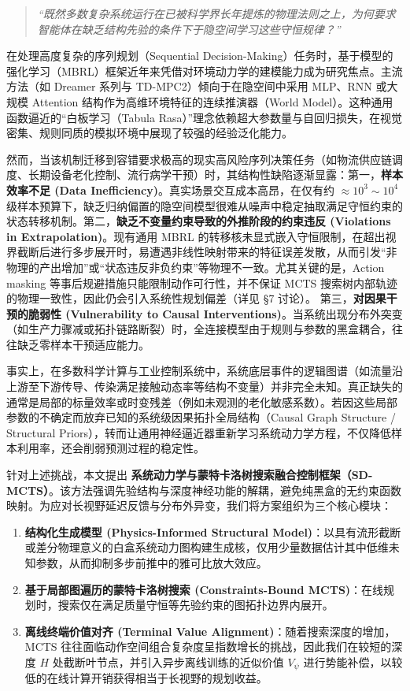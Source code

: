 \documentclass[UTF8]{ctexart}
\begin{document}
\begin{quote}
\emph{``既然多数复杂系统运行在已被科学界长年提炼的物理法则之上，为何要求智能体在缺乏结构先验的条件下于隐空间学习这些守恒规律？''}
\end{quote}

在处理高度复杂的序列规划（Sequential Decision-Making）任务时，基于模型的强化学习（MBRL）框架近年来凭借对环境动力学的建模能力成为研究焦点。主流方法（如 Dreamer 系列与 TD-MPC2）倾向于在隐空间中采用 MLP、RNN 或大规模 Attention 结构作为高维环境特征的连续推演器（World Model）。这种通用函数逼近的``白板学习（Tabula Rasa）''理念依赖超大参数量与自回归损失，在视觉密集、规则同质的模拟环境中展现了较强的经验泛化能力。

然而，当该机制迁移到容错要求极高的现实高风险序列决策任务（如物流供应链调度、长期设备老化控制、流行病学干预）时，其结构性缺陷逐渐显露：第一，\textbf{样本效率不足 (Data Inefficiency)}。真实场景交互成本高昂，在仅有约 \(\approx 10^3 \sim 10^4\) 级样本预算下，缺乏归纳偏置的隐空间模型很难从噪声中稳定抽取满足守恒约束的状态转移机制。第二，\textbf{缺乏不变量约束导致的外推阶段的约束违反 (Violations in Extrapolation)}。现有通用 MBRL 的转移核未显式嵌入守恒限制，在超出视界截断后进行多步展开时，易遭遇非线性映射带来的特征误差发散，从而引发``非物理的产出增加''或``状态违反非负约束''等物理不一致。尤其关键的是，Action masking 等事后规避措施只能限制动作可行性，并不保证 MCTS 搜索树内部轨迹的物理一致性，因此仍会引入系统性规划偏差（详见 §7 讨论）。 第三，\textbf{对因果干预的脆弱性 (Vulnerability to Causal Interventions)}。当系统出现分布外突变（如生产力骤减或拓扑链路断裂）时，全连接模型由于规则与参数的黑盒耦合，往往缺乏零样本干预适应能力。

事实上，在多数科学计算与工业控制系统中，系统底层事件的逻辑图谱（如流量沿上游至下游传导、传染满足接触动态率等结构不变量）并非完全未知。真正缺失的通常是局部的标量效率或时变残差（例如未观测的老化敏感系数）。若因这些局部参数的不确定而放弃已知的系统级因果拓扑全局结构（Causal Graph Structure / Structural Priors），转而让通用神经逼近器重新学习系统动力学方程，不仅降低样本利用率，还会削弱预测过程的稳定性。

针对上述挑战，本文提出 \textbf{系统动力学与蒙特卡洛树搜索融合控制框架（SD-MCTS）}。该方法强调先验结构与深度神经功能的解耦，避免纯黑盒的无约束函数映射。为应对长视野延迟反馈与分布外异变，我们将方案组织为三个核心模块：

\begin{enumerate}
\item \textbf{结构化生成模型 (Physics-Informed Structural Model)}：以具有流形截断或差分物理意义的白盒系统动力图构建生成核，仅用少量数据估计其中低维未知参数，从而抑制多步前推中的雅可比放大效应。
\item \textbf{基于局部图遍历的蒙特卡洛树搜索 (Constraints-Bound MCTS)}：在线规划时，搜索仅在满足质量守恒等先验约束的图拓扑边界内展开。
\item \textbf{离线终端价值对齐 (Terminal Value Alignment)}：随着搜索深度的增加，MCTS 往往面临动作空间组合复杂度呈指数增长的挑战，因此我们在较短的深度 \(H\) 处截断叶节点，并引入异步离线训练的近似价值 \(V_{\psi}\) 进行势能补偿，以较低的在线计算开销获得相当于长视野的规划收益。
\end{enumerate}
\end{document}

